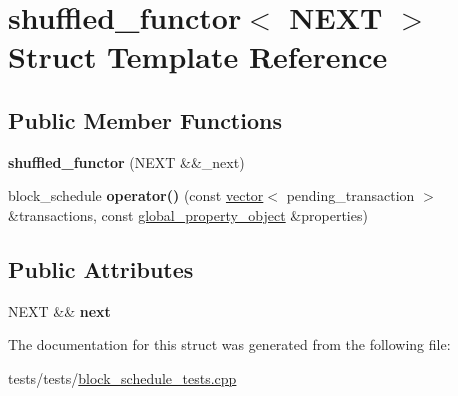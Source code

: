 \hypertarget{structshuffled__functor}{}\section{shuffled\+\_\+functor$<$ N\+E\+XT $>$ Struct Template Reference}
\label{structshuffled__functor}
\subsection*{Public Member Functions}
\begin{DoxyCompactItemize}
\item 
\mbox{\label{structshuffled__functor_a86562d8f3753b4452e495d51aee408de}} 
{\bfseries shuffled\+\_\+functor} (N\+E\+XT \&\&\+\_\+next)
\item 
\mbox{\label{structshuffled__functor_aaf34d3d13e52c1ce3d81120b2561221b}} 
block\+\_\+schedule {\bfseries operator()} (const \mbox{\hyperlink{classstd_1_1vector}{vector}}$<$ pending\+\_\+transaction $>$ \&transactions, const \mbox{\hyperlink{classaacio_1_1chain_1_1global__property__object}{global\+\_\+property\+\_\+object}} \&properties)
\end{DoxyCompactItemize}
\subsection*{Public Attributes}
\begin{DoxyCompactItemize}
\item 
\mbox{\label{structshuffled__functor_ae56d14d46e141e3c85b81dafaa9e2f85}} 
N\+E\+XT \&\& {\bfseries next}
\end{DoxyCompactItemize}


The documentation for this struct was generated from the following file\+:\begin{DoxyCompactItemize}
\item 
tests/tests/\mbox{\hyperlink{block__schedule__tests_8cpp}{block\+\_\+schedule\+\_\+tests.\+cpp}}\end{DoxyCompactItemize}
